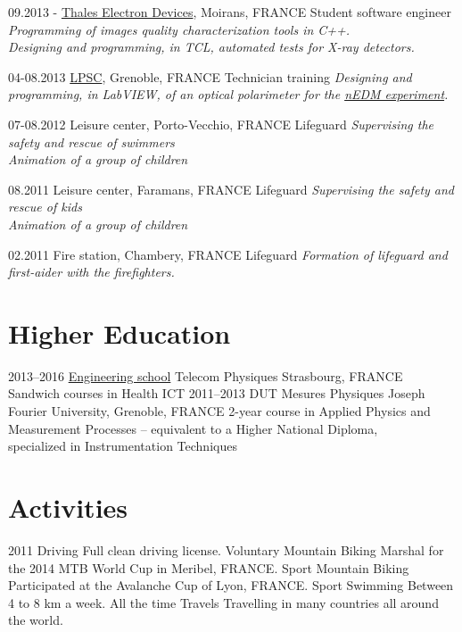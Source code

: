 \documentclass[]{Elie-cv}
\begin{document}
\begin{entrylist}
  \entry
    {09.2013 -}
    {\href{https://www.thalesgroup.com/en/microwave-imaging-sub-systems/radiology}{Thales Electron Devices}, Moirans, FRANCE}
    {Student software engineer}
    {\emph{Programming of images quality characterization tools in C++. \\
				Designing and programming, in TCL, automated tests for X-ray detectors.}}
   
   \entry
    {04-08.2013}
    {\href{http://lpsc.in2p3.fr/index.php/en/}{LPSC}, Grenoble, FRANCE}
    {Technician training}
    {\emph{Designing and programming, in LabVIEW, of an optical polarimeter for the {\href{http://nedm.web.psi.ch/}{nEDM experiment}}.}}
   
   \entry
    {07-08.2012}
    {Leisure center, Porto-Vecchio, FRANCE}
    {Lifeguard}
    {\emph{Supervising the safety and rescue of swimmers \\
    			Animation of a group of children}}
    			
   \entry
    {08.2011}
    {Leisure center, Faramans, FRANCE}
    {Lifeguard}
    {\emph{Supervising the safety and rescue of kids \\
    			Animation of a group of children}}
   
   \entry
    {02.2011}
    {Fire station, Chambery, FRANCE}
    {Lifeguard}
    {\emph{Formation of lifeguard and first-aider with the firefighters.}}
      
\end{entrylist}

\section{Higher Education}

\begin{entrylist}
  \entry
    {2013–2016}
    {\href{http://www.telecom-physique.fr}{Engineering school}}
    {Telecom Physiques Strasbourg, FRANCE}
    {Sandwich courses in Health ICT}
  \entry
    {2011–2013}
    {DUT Mesures Physiques}
    {Joseph Fourier University, Grenoble, FRANCE}
    {2-year course in Applied Physics and Measurement Processes – equivalent to a Higher National Diploma,\\
    			specialized in Instrumentation Techniques}
\end{entrylist}

\section{Activities}

\begin{entrylist}
  \entry
    {2011}
    {Driving}
    {}
    {Full clean driving license.}
   \entry
    {Voluntary}
    {Mountain Biking}
    {}
    {Marshal for the 2014 MTB World Cup in Meribel, FRANCE.}
   \entry
    {Sport}
    {Mountain Biking}
    {}
    {Participated at the Avalanche Cup of Lyon, FRANCE.}
   \entry
    {Sport}
    {Swimming}
    {}
    {Between 4 to 8 km a week.}
   \entry
    {All the time}
    {Travels}
    {}
    {Travelling in many countries all around the world.}
\end{entrylist}
\end{document}
